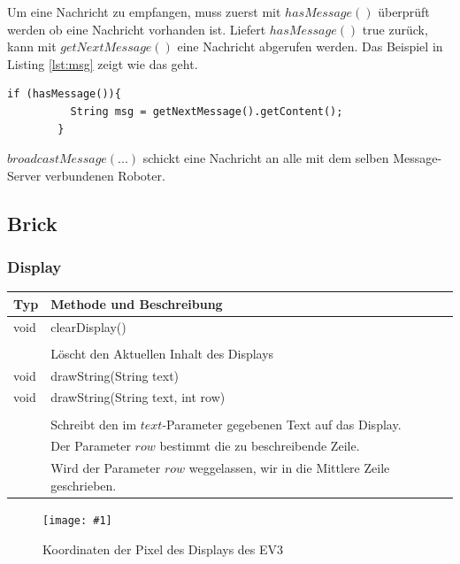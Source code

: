 \documentclass[
	12pt,
	colorbacktitle,
	accentcolor=tud1c,
	german,
	article
]{tuddesign/tudreport}
\newcommand{\gcenter}[4]{
	\begin{figure}[h]
	\centering 
	\texttt{[image: \#1]}
	\caption{#2}
	\label{fig:#3}
	\end{figure}
}
\begin{document}
		Um eine Nachricht zu empfangen, muss zuerst mit $hasMessage()$ überprüft werden ob eine Nachricht vorhanden ist. Liefert $hasMessage()$ true zurück, kann mit $getNextMessage()$ eine Nachricht abgerufen werden. Das Beispiel in Listing \ref{lst:msg} zeigt wie das geht.
		
		\begin{lstlisting}[captionpos=b, caption=Beispiel zum Abrufen einer Nachricht, label=lst:msg]
		if (hasMessage()){
          String msg = getNextMessage().getContent();
        }
		\end{lstlisting}
		
		$broadcastMessage(...)$ schickt eine Nachricht an alle mit dem selben Message-Server verbundenen Roboter.
		
		
		
	\newpage
	\subsection{Brick}
	\subsubsection{Display}
		\begin{table}[htbp]
		\begin{tabular}{|p{} p{}|}
		\hline
		\textbf{Typ} & \textbf{Methode und Beschreibung} \\ \hline
		void & clearDisplay() \\ 
		&\\
		& Löscht den Aktuellen Inhalt des Displays \\ \hline
		void & drawString(String text)\\			
		void & drawString(String text, int row)\\
		&\\
		& Schreibt den im $text$-Parameter gegebenen Text auf das Display.\\
		& Der Parameter $row$ bestimmt die zu beschreibende Zeile. \\
		& Wird der Parameter $row$ weggelassen, wir in die Mittlere Zeile geschrieben. \\

		\end{tabular}
		\end{table}
		
		\gcenter{img/ev3_display}{Koordinaten der Pixel des Displays des EV3\protect\footnotemark\ }{display}{.5\textwidth}
		
\end{document}

